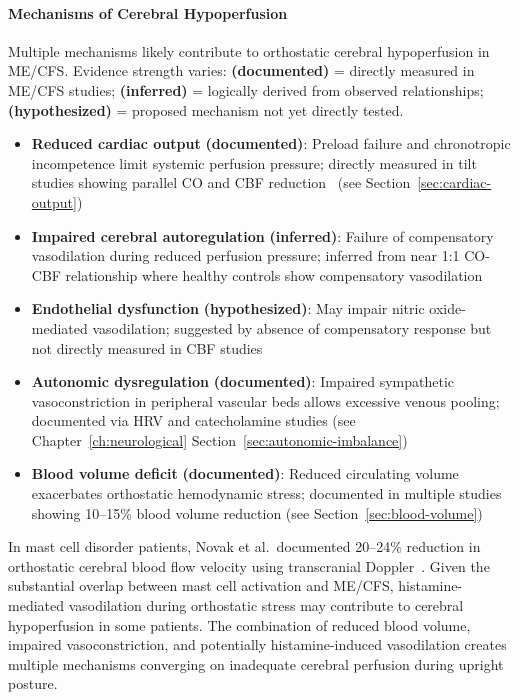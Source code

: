 \paragraph{Mechanisms of Cerebral Hypoperfusion}

Multiple mechanisms likely contribute to orthostatic cerebral hypoperfusion in ME/CFS. Evidence strength varies: \textbf{(documented)} = directly measured in ME/CFS studies; \textbf{(inferred)} = logically derived from observed relationships; \textbf{(hypothesized)} = proposed mechanism not yet directly tested.

\begin{itemize}
    \item \textbf{Reduced cardiac output} \textbf{(documented)}: Preload failure and chronotropic incompetence limit systemic perfusion pressure; directly measured in tilt studies showing parallel CO and CBF reduction~\cite{VanCampenEtAl2024} (see Section~\ref{sec:cardiac-output})
    \item \textbf{Impaired cerebral autoregulation} \textbf{(inferred)}: Failure of compensatory vasodilation during reduced perfusion pressure; inferred from near 1:1 CO-CBF relationship where healthy controls show compensatory vasodilation~\cite{VanCampenEtAl2024}
    \item \textbf{Endothelial dysfunction} \textbf{(hypothesized)}: May impair nitric oxide-mediated vasodilation; suggested by absence of compensatory response but not directly measured in CBF studies
    \item \textbf{Autonomic dysregulation} \textbf{(documented)}: Impaired sympathetic vasoconstriction in peripheral vascular beds allows excessive venous pooling; documented via HRV and catecholamine studies (see Chapter~\ref{ch:neurological} Section~\ref{sec:autonomic-imbalance})
    \item \textbf{Blood volume deficit} \textbf{(documented)}: Reduced circulating volume exacerbates orthostatic hemodynamic stress; documented in multiple studies showing 10--15\% blood volume reduction (see Section~\ref{sec:blood-volume})
\end{itemize}

In mast cell disorder patients, Novak et al.\ documented 20--24\% reduction in orthostatic cerebral blood flow velocity using transcranial Doppler~\cite{Novak2022}. Given the substantial overlap between mast cell activation and ME/CFS, histamine-mediated vasodilation during orthostatic stress may contribute to cerebral hypoperfusion in some patients. The combination of reduced blood volume, impaired vasoconstriction, and potentially histamine-induced vasodilation creates multiple mechanisms converging on inadequate cerebral perfusion during upright posture.

